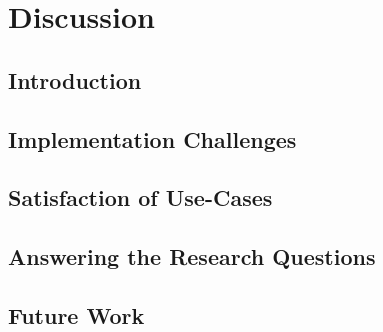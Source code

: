 
\chapter{Discussion} %

\label{Chapter7} %


\section{Introduction}

\section{Implementation Challenges}
% 

\section{Satisfaction of Use-Cases}

\section{Answering the Research Questions}


\section{Future Work}



